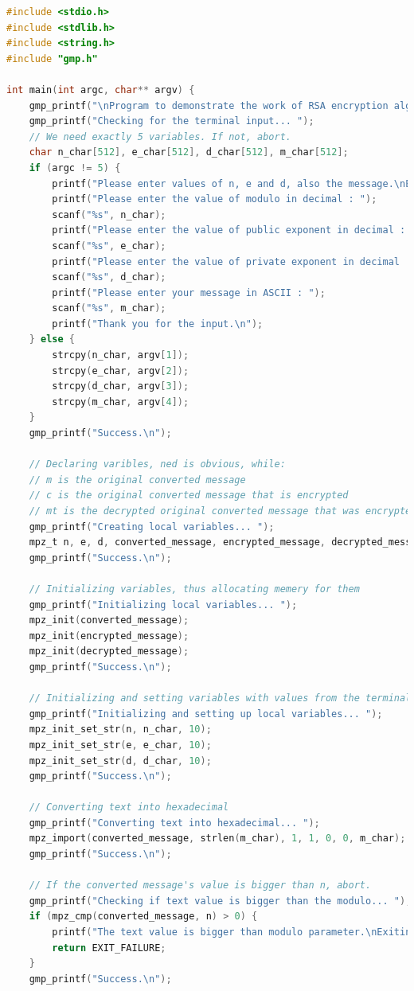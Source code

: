 \documentclass[a4paper, 12pt]{article}
\begin{document}
\begin{lstlisting}[language=C, caption=Source Code of rsa.c]
#include <stdio.h> 
#include <stdlib.h>
#include <string.h>
#include "gmp.h"

int main(int argc, char** argv) {
    gmp_printf("\nProgram to demonstrate the work of RSA encryption algorithm.\n\n");
    gmp_printf("Checking for the terminal input... ");
    // We need exactly 5 variables. If not, abort.
    char n_char[512], e_char[512], d_char[512], m_char[512];
    if (argc != 5) {
        printf("Please enter values of n, e and d, also the message.\nExiting...\n");
        printf("Please enter the value of modulo in decimal : ");
        scanf("%s", n_char);
        printf("Please enter the value of public exponent in decimal : ");
        scanf("%s", e_char);
        printf("Please enter the value of private exponent in decimal : ");
        scanf("%s", d_char);
        printf("Please enter your message in ASCII : ");
        scanf("%s", m_char);
        printf("Thank you for the input.\n");
    } else {
        strcpy(n_char, argv[1]);
        strcpy(e_char, argv[2]);
        strcpy(d_char, argv[3]);
        strcpy(m_char, argv[4]);
    }
    gmp_printf("Success.\n");
    
    // Declaring varibles, ned is obvious, while:
    // m is the original converted message
    // c is the original converted message that is encrypted
    // mt is the decrypted original converted message that was encrypted 
    gmp_printf("Creating local variables... ");
    mpz_t n, e, d, converted_message, encrypted_message, decrypted_message;
    gmp_printf("Success.\n");
    
    // Initializing variables, thus allocating memery for them
    gmp_printf("Initializing local variables... ");
    mpz_init(converted_message);
    mpz_init(encrypted_message);
    mpz_init(decrypted_message);
    gmp_printf("Success.\n");
    
    // Initializing and setting variables with values from the terminal input
    gmp_printf("Initializing and setting up local variables... ");
    mpz_init_set_str(n, n_char, 10);
    mpz_init_set_str(e, e_char, 10);
    mpz_init_set_str(d, d_char, 10);
    gmp_printf("Success.\n");
    
    // Converting text into hexadecimal
    gmp_printf("Converting text into hexadecimal... ");
    mpz_import(converted_message, strlen(m_char), 1, 1, 0, 0, m_char);
    gmp_printf("Success.\n");
  
    // If the converted message's value is bigger than n, abort.
    gmp_printf("Checking if text value is bigger than the modulo... ");
    if (mpz_cmp(converted_message, n) > 0) {
        printf("The text value is bigger than modulo parameter.\nExiting...\n");
        return EXIT_FAILURE;
    }
    gmp_printf("Success.\n");
    

\end{lstlisting}
\end{document}
